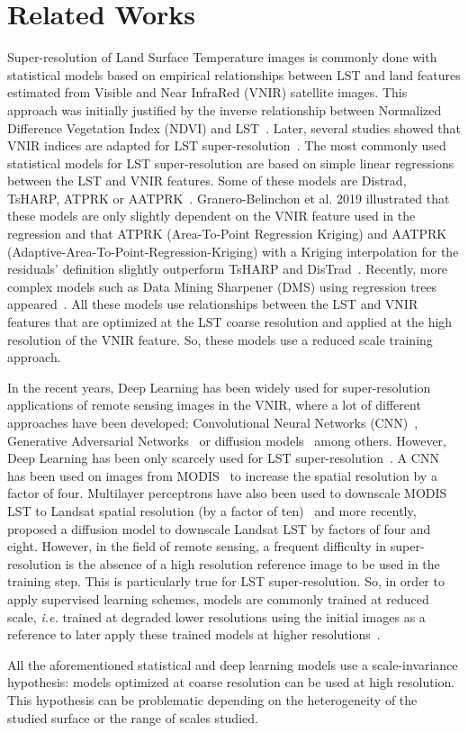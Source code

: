 \section{Related Works}
\label{sec:relatedworks}

Super-resolution of Land Surface Temperature images is commonly done with statistical models based on empirical relationships between LST and land features estimated from Visible and Near InfraRed (VNIR) satellite images. This approach was initially justified by the inverse relationship between Normalized Difference Vegetation Index (NDVI) and LST~\cite{Cai2018, Govil2019}. Later, several studies showed that VNIR indices are adapted for LST super-resolution~\cite{Kumar2015,Ferreira2019,GraneroBelinchon2019}. The most commonly used statistical models for LST super-resolution are based on simple linear regressions between the LST and VNIR features. Some of these models are Distrad, TsHARP, ATPRK or AATPRK~\cite{Essa2012,  Kustas2003, TsHARP2nd, Wang2015, Wang2016}. Granero-Belinchon et al. 2019 illustrated that these models are only slightly dependent on the VNIR feature used in the regression and that ATPRK (Area-To-Point Regression Kriging) and AATPRK (Adaptive-Area-To-Point-Regression-Kriging) with a Kriging interpolation for the residuals' definition slightly outperform TsHARP and DisTrad~\cite{GraneroBelinchon2019}. Recently, more complex models such as Data Mining Sharpener (DMS) using regression trees appeared~\cite{Gao2012, Xue2020, Guzinski2019}. All these models use relationships between the LST and VNIR features that are optimized at the LST coarse resolution and applied at the high resolution of the VNIR feature. So, these models use a reduced scale training approach.


In the recent years, Deep Learning has been widely used for super-resolution applications of remote sensing images in the VNIR, where a lot of different approaches have been developed: Convolutional Neural Networks (CNN)~\cite{Gargiulo2019, Lanaras2018}, Generative Adversarial Networks~\cite{Brodu2017} or diffusion models~\cite{Xiao2023} among others. However, Deep Learning has been only scarcely used for LST super-resolution~\cite{Nguyen2022,Chen2024,Choe2017}. A CNN has been used on images from MODIS~\cite{Nguyen2022} to increase the spatial resolution by a factor of four. Multilayer perceptrons have also been used to downscale MODIS LST to Landsat spatial resolution (by a factor of ten)~\cite{Choe2017} and more recently, \cite{Chen2024} proposed a diffusion model to downscale Landsat LST by factors of four and eight. However, in the field of remote sensing, a frequent difficulty in super-resolution is the absence of a high resolution reference image to be used in the training step. This is particularly true for LST super-resolution. So, in order to apply supervised learning schemes, models are commonly trained at reduced scale, \textit{i.e.} trained at degraded lower resolutions using the initial images as a reference to later apply these trained models at higher resolutions~\cite{Nguyen2022, Chen2024, Choe2017}.

All the aforementioned statistical and deep learning models use a scale-invariance hypothesis: models optimized at coarse resolution can be used at high resolution. This hypothesis can be problematic depending on the heterogeneity of the studied surface or the range of scales studied.